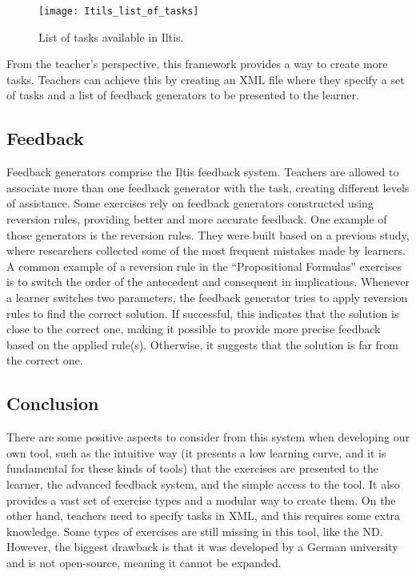 \begin{figure}[htbp]
    \centering
    \texttt{[image: Itils\_list\_of\_tasks]}
    \caption{List of tasks available in Iltis.}
    \label{img:iltis_tasks}
\end{figure}

From the teacher’s perspective, this framework provides a way to create more tasks. Teachers can achieve this by creating an XML file where they specify a set of tasks and a list of feedback generators to be presented to the learner.

\subsection{Feedback}
\label{chap:iltis-feedback}
Feedback generators comprise the Iltis feedback system. Teachers are allowed to associate more than one feedback generator with the task, creating different levels of assistance. Some exercises rely on feedback generators constructed using reversion rules, providing better and more accurate feedback. One example of those generators is the reversion rules. They were built based on a previous study, where researchers collected some of the most frequent mistakes made by learners. A common example of a reversion rule in the “Propositional Formulas” exercises is to switch the order of the antecedent and consequent in implications. Whenever a learner switches two parameters, the feedback generator tries to apply reversion rules to find the correct solution. If successful, this indicates that the solution is close to the correct one, making it possible to provide more precise feedback based on the applied rule(s). Otherwise, it suggests that the solution is far from the correct one.

\subsection{Conclusion}
There are some positive aspects to consider from this system when developing our own tool, such as the intuitive way (it presents a low learning curve, and it is fundamental for these kinds of tools) that the exercises are presented to the learner, the advanced feedback system, and the simple access to the tool. It also provides a vast set of exercise types and a modular way to create them. On the other hand, teachers need to specify tasks in XML, and this requires some extra knowledge. Some types of exercises are still missing in this tool, like the \gls{ND}. However, the biggest drawback is that it was developed by a German university and is not open-source, meaning it cannot be expanded.

